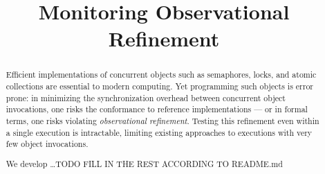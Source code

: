 \documentclass[pldi,10pt,nocopyrightspace]{sigplanconf}
\title{Monitoring Observational Refinement} %
\begin{document}
  \maketitle

  \begin{abstract}

    Efficient implementations of concurrent objects such as semaphores, locks,
    and atomic collections are essential to modern computing. Yet programming
    such objects is error prone: in minimizing the synchronization overhead
    between concurrent object invocations, one risks the conformance to
    reference implementations --- or in formal terms, one risks violating
    \emph{observational refinement}. Testing this refinement even within a
    single execution is intractable, limiting existing approaches to executions
    with very few object invocations.

    We develop \ldots TODO FILL IN THE REST ACCORDING TO README.md
    
  \end{abstract}

  
  
  
  
  
  
  
  
  
  
  
\end{document}
